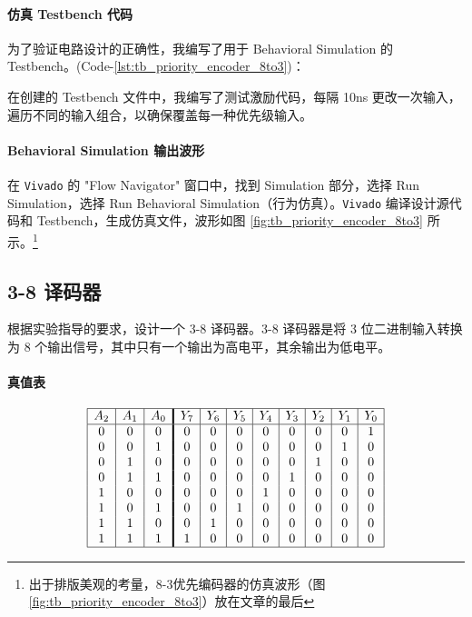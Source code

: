 \documentclass[10pt,a4paper,twoside]{rho-class/rho}
\begin{document}
        
        \paragraph{仿真 Testbench 代码}
        
            为了验证电路设计的正确性，我编写了用于 Behavioral Simulation 的 Testbench。(Code-\ref{lst:tb_priority_encoder_8to3})：
                

        
            在创建的 Testbench 文件中，我编写了测试激励代码，每隔 10ns 更改一次输入，遍历不同的输入组合，以确保覆盖每一种优先级输入。
        
        \paragraph{Behavioral Simulation 输出波形}
        
            在 \verb|Vivado| 的 "Flow Navigator" 窗口中，找到 Simulation 部分，选择 Run Simulation，选择 Run Behavioral Simulation（行为仿真）。\verb|Vivado| 编译设计源代码和 Testbench，生成仿真文件，波形如图 \ref{fig:tb_priority_encoder_8to3} 所示。\footnote{出于排版美观的考量，8-3优先编码器的仿真波形（图 \ref{fig:tb_priority_encoder_8to3}）放在文章的最后}
            



    \subsection{3-8 译码器}       
        根据实验指导的要求，设计一个 3-8 译码器。3-8 译码器是将 3 位二进制输入转换为 8 个输出信号，其中只有一个输出为高电平，其余输出为低电平。
        
        \paragraph{真值表}
            \[
            \begin{array}{|c|c|c!{\vrule width 1.4pt}c|c|c|c|c|c|c|c|c|}
            \hline
            A_2 & A_1 & A_0 & Y_7 & Y_6 & Y_5 & Y_4 & Y_3 & Y_2 & Y_1 & Y_0 \\
            \hline
            0 & 0 & 0 & 0 & 0 & 0 & 0 & 0 & 0 & 0 & 1 \\
            0 & 0 & 1 & 0 & 0 & 0 & 0 & 0 & 0 & 1 & 0 \\
            0 & 1 & 0 & 0 & 0 & 0 & 0 & 0 & 1 & 0 & 0 \\
            0 & 1 & 1 & 0 & 0 & 0 & 0 & 1 & 0 & 0 & 0 \\
            1 & 0 & 0 & 0 & 0 & 0 & 1 & 0 & 0 & 0 & 0 \\
            1 & 0 & 1 & 0 & 0 & 1 & 0 & 0 & 0 & 0 & 0 \\
            1 & 1 & 0 & 0 & 1 & 0 & 0 & 0 & 0 & 0 & 0 \\
            1 & 1 & 1 & 1 & 0 & 0 & 0 & 0 & 0 & 0 & 0 \\
            \hline
            \end{array}
            \]
        
\end{document}
